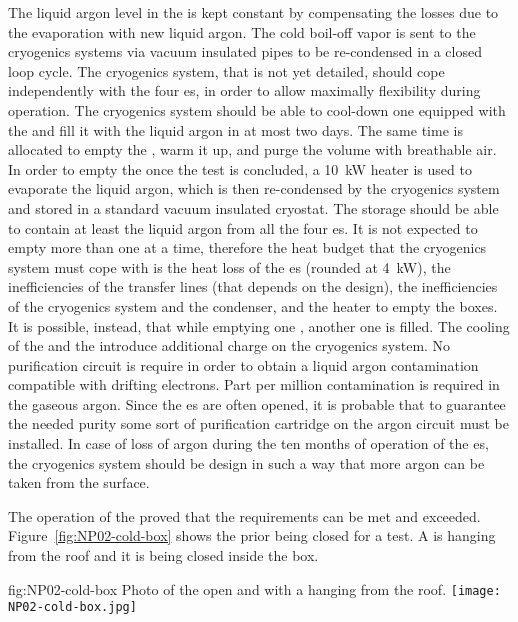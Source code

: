 The liquid argon level in the  \coldbox is kept constant by compensating the losses due to the evaporation with new liquid argon.
The cold boil-off vapor is sent to the cryogenics systems via vacuum insulated pipes to be re-condensed in a closed loop cycle.
The cryogenics system, that is not yet detailed, should cope independently with the four  \coldbox{}es, in order to allow maximally flexibility during operation.
The cryogenics system should be able to cool-down one  \coldbox equipped with the  and fill it with the liquid argon in at most two days.
The same time is allocated to empty the \coldbox, warm it up, and purge the volume with breathable air.
In order to empty the  \coldbox once the test is concluded, a 10~kW heater is used to evaporate the liquid argon, which is then re-condensed by the cryogenics system and stored in a standard vacuum insulated cryostat.
The storage should be able to contain at least the liquid argon from all the four  \coldbox{}es.
It is not expected to empty more than one  \coldbox at a time, therefore the heat budget that the cryogenics system must cope with is the heat loss of the  \coldbox{}es (rounded at 4~kW), the inefficiencies of the transfer lines (that depends on the design), the inefficiencies of the cryogenics system and the condenser, and the heater to empty the boxes.
It is possible, instead, that while emptying one  \coldbox, another one is filled.
The cooling of the  \coldbox and the  introduce additional charge on the cryogenics system.
No purification circuit is require in order to obtain a liquid argon contamination compatible with drifting electrons.
Part per million contamination is required in the gaseous argon.
Since the  \coldbox{}es are often opened, it is probable that to guarantee the needed purity some sort of purification cartridge on the argon circuit must be installed.
In case of loss of argon during the ten months of operation of the  \coldbox{}es, the cryogenics system should be design in such a way that more argon can be taken from the surface.

The operation of the   \coldbox proved that the requirements can be met and exceeded.
Figure~\ref{fig:NP02-cold-box} shows the   \coldbox prior being closed for a test.
A  is hanging from the roof and it is being closed inside the box.
\begin{dunefigure}{fig:NP02-cold-box}
{Photo of the  \coldbox open and with a  hanging from the roof.}
\texttt{[image: NP02-cold-box.jpg]}
\end{dunefigure}

